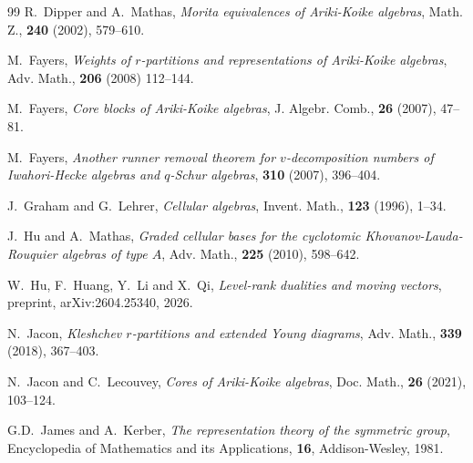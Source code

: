 \documentclass[a4paper,10pt]{amsart}
\theoremstyle{plain}
\theoremstyle{plain}
\numberwithin{equation}{section}
\begin{document}
\begin{thebibliography}{99}
 {\sc R.~Dipper and A.~Mathas}, {\em Morita equivalences of Ariki-Koike algebras}, Math. Z., {\bf 240} (2002), 579--610.

 {\sc M.~Fayers}, {\em Weights of $r$-partitions and representations of Ariki-Koike algebras}, Adv. Math., \textbf{206} (2008) 112--144.

 {\sc M.~Fayers}, {\em Core blocks of Ariki-Koike algebras}, J. Algebr. Comb., {\bf 26} (2007), 47--81.


 {\sc M.~Fayers}, {\em Another runner removal theorem for $v$-decomposition numbers of Iwahori-Hecke algebras and $q$-Schur algebras}, {\bf 310} (2007), 396--404.

%

 {\sc J.~Graham and G.~Lehrer}, {\em Cellular algebras}, Invent. Math., {\bf 123} (1996), 1--34.

{\sc J.~Hu and A.~Mathas}, {\em  Graded cellular bases for the cyclotomic Khovanov-Lauda-Rouquier algebras of type $A$}, Adv. Math., {\bf 225} (2010), 598--642.

 {\sc W.~Hu, F.~Huang, Y.~Li and X.~Qi}, {\em Level-rank dualities and moving vectors}, preprint, {arXiv:2604.25340}, 2026.

 {\sc N.~Jacon}, {\em Kleshchev $r$-partitions and extended Young diagrams}, Adv. Math., {\bf 339} (2018), 367--403.

 {\sc N.~Jacon and C.~Lecouvey}, {\em Cores of Ariki-Koike algebras}, Doc. Math., {\bf 26} (2021), 103--124.


{\sc G.D.~James and A.~Kerber}, {\em The representation theory of the symmetric group}, Encyclopedia of Mathematics and its Applications, {\textbf{16}}, Addison-Wesley, 1981.


\end{thebibliography}
\end{document}
